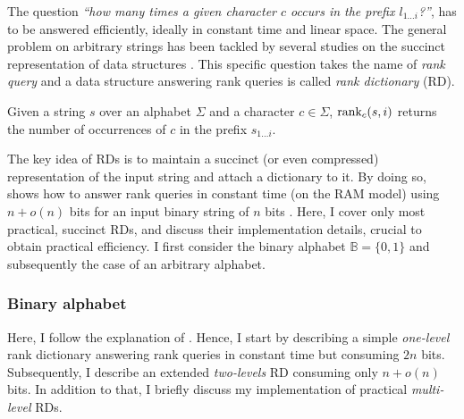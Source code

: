 The question \emph{``how many times a given character $c$ occurs in the prefix $l_{1 \dots i}$?''}, has to be answered efficiently, ideally in constant time and linear space.
The general problem on arbitrary strings has been tackled by several studies on the succinct representation of data structures \citep{Jacobson1989}.
This specific question takes the name of \emph{rank query} and a data structure answering rank queries is called \emph{rank dictionary} (RD).

\begin{definition}
Given a string $s$ over an alphabet $\Sigma$ and a character $c \in \Sigma$, $\text{rank}_c(s, i)$ returns the number of occurrences of $c$ in the prefix $s_{1 \dots i}$.
\end{definition}

The key idea of RDs is to maintain a succinct (or even compressed) representation of the input string and attach a dictionary to it.
By doing so, \citeauthor{Jacobson1989} shows how to answer rank queries in constant time (on the RAM model) using $n+o(n)$ bits for an input binary string of $n$ bits \citep{Jacobson1989}.
Here, I cover only most practical, succinct RDs, and discuss their implementation details, crucial to obtain practical efficiency.
I first consider the binary alphabet $\mathbb{B} = \{ 0, 1 \}$ and subsequently the case of an arbitrary alphabet.

\subsubsection{Binary alphabet}
\label{sec:index:rd:binary}

Here, I follow the explanation of \citep{Navarro2007}.
Hence, I start by describing a simple \emph{one-level} rank dictionary answering rank queries in constant time but consuming $2n$ bits.
Subsequently, I describe an extended \emph{two-levels} RD consuming only $n + o(n)$ bits.
In addition to that, I briefly discuss my implementation of practical \emph{multi-level} RDs.

